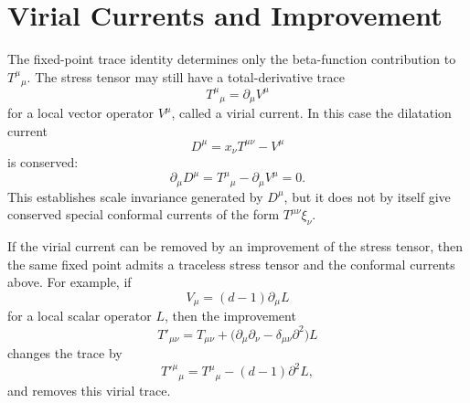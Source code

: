 \section{Virial Currents and Improvement}

The fixed-point trace identity determines only the beta-function contribution
to \(T^\mu{}_\mu\).  The stress tensor may still have a total-derivative trace
\[
  T^\mu{}_\mu=\partial_\mu V^\mu
\]
for a local vector operator \(V^\mu\), called a virial current.  In this case
the dilatation current
\[
  D^\mu=x_\nu T^{\mu\nu}-V^\mu
\]
is conserved:
\[
  \partial_\mu D^\mu
  =
  T^\mu{}_\mu-\partial_\mu V^\mu
  =
  0.
\]
This establishes scale invariance generated by \(D^\mu\), but it does not by
itself give conserved special conformal currents of the form
\(T^{\mu\nu}\xi_\nu\).

If the virial current can be removed by an improvement of the stress tensor,
then the same fixed point admits a traceless stress tensor and the conformal
currents above.  For example, if
\[
  V_\mu=(d-1)\partial_\mu L
\]
for a local scalar operator \(L\), then the improvement
\[
  T'_{\mu\nu}
  =
  T_{\mu\nu}
  +
  \bigl(\partial_\mu\partial_\nu-\delta_{\mu\nu}\partial^2\bigr)L
\]
changes the trace by
\[
  T'^\mu{}_\mu
  =
  T^\mu{}_\mu
  -
  (d-1)\partial^2L,
\]
and removes this virial trace.

